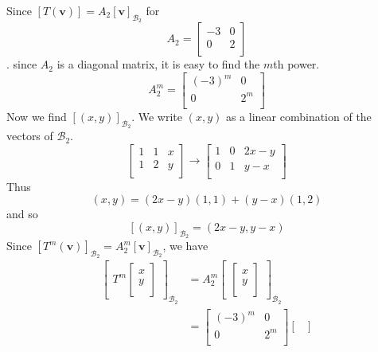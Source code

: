 \documentclass{article}
\begin{document}
\begin{example}
  Since $[T(\textbf{v})] = A_2[\textbf{v}]_{\mathcal{B}_2}$ for \[A_2 =
    \begin{bmatrix}
      -3 & 0 \\
      0  & 2 \\
    \end{bmatrix}\]. since $A_2$ is a diagonal matrix, it is easy to find the $m$th power.
  \[
    A_2^m =
    \begin{bmatrix}
      (-3)^m & 0   \\
      0      & 2^m \\
    \end{bmatrix}
  \]
  Now we find $[(x, y)]_{\mathcal{B}_2}$. We write $(x, y)$ as a linear combination of the vectors of $\mathcal{B}_2$. \[
    \begin{bmatrix}
      1 & 1 & x \\
      1 & 2 & y \\
    \end{bmatrix} \to
    \begin{bmatrix}
      1 & 0 & 2x - y \\
      0 & 1 & y- x   \\
    \end{bmatrix}
  \]
  Thus \[
    (x, y) = (2x - y)(1, 1) + (y - x)(1, 2)
  \] and so \[
    [(x, y)]_{\mathcal{B}_2} = (2x - y, y - x)
  \]
  Since $[T^m(\textbf{v})]_{\mathcal{B}_2} = A_2^m[\textbf{v}]_{\mathcal{B}_2}$, we have
  \begin{align*}
    \begin{bmatrix}
      T^m
      \begin{bmatrix}
        x \\y\\
      \end{bmatrix}
    \end{bmatrix}_{\mathcal{B}_2} & = A_2^m
    \begin{bmatrix}
      \begin{bmatrix}
        x \\y\\
      \end{bmatrix}
    \end{bmatrix}_{\mathcal{B}_2}           \\
                                  & =
    \begin{bmatrix}
      (-3)^m & 0   \\
      0      & 2^m \\
    \end{bmatrix}
    \begin{bmatrix}

\end{bmatrix}
\end{align*}
\end{example}
\end{document}
